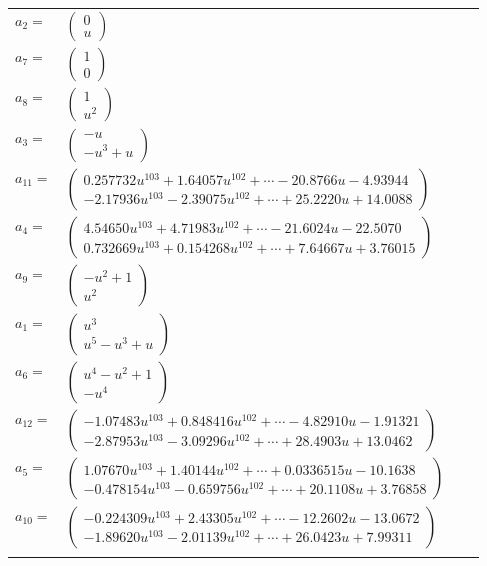 \documentclass[1p]{elsarticle_modified}
\theoremstyle{definition}
\begin{document}
\begin{tabular}{m{7pt} m{180pt} m{7pt} m{180pt} }
\flushright $a_{2}=$&$\begin{pmatrix}0\\u\end{pmatrix}$ \\
\flushright $a_{7}=$&$\begin{pmatrix}1\\0\end{pmatrix}$ \\
\flushright $a_{8}=$&$\begin{pmatrix}1\\u^2\end{pmatrix}$ \\
\flushright $a_{3}=$&$\begin{pmatrix}- u\\- u^3+u\end{pmatrix}$ \\
\flushright $a_{11}=$&$\begin{pmatrix}0.257732 u^{103}+1.64057 u^{102}+\cdots-20.8766 u-4.93944\\-2.17936 u^{103}-2.39075 u^{102}+\cdots+25.2220 u+14.0088\end{pmatrix}$ \\
\flushright $a_{4}=$&$\begin{pmatrix}4.54650 u^{103}+4.71983 u^{102}+\cdots-21.6024 u-22.5070\\0.732669 u^{103}+0.154268 u^{102}+\cdots+7.64667 u+3.76015\end{pmatrix}$ \\
\flushright $a_{9}=$&$\begin{pmatrix}- u^2+1\\u^2\end{pmatrix}$ \\
\flushright $a_{1}=$&$\begin{pmatrix}u^3\\u^5- u^3+u\end{pmatrix}$ \\
\flushright $a_{6}=$&$\begin{pmatrix}u^4- u^2+1\\- u^4\end{pmatrix}$ \\
\flushright $a_{12}=$&$\begin{pmatrix}-1.07483 u^{103}+0.848416 u^{102}+\cdots-4.82910 u-1.91321\\-2.87953 u^{103}-3.09296 u^{102}+\cdots+28.4903 u+13.0462\end{pmatrix}$ \\
\flushright $a_{5}=$&$\begin{pmatrix}1.07670 u^{103}+1.40144 u^{102}+\cdots+0.0336515 u-10.1638\\-0.478154 u^{103}-0.659756 u^{102}+\cdots+20.1108 u+3.76858\end{pmatrix}$ \\
\flushright $a_{10}=$&$\begin{pmatrix}-0.224309 u^{103}+2.43305 u^{102}+\cdots-12.2602 u-13.0672\\-1.89620 u^{103}-2.01139 u^{102}+\cdots+26.0423 u+7.99311\end{pmatrix}$\\&\end{tabular}
\end{document}
